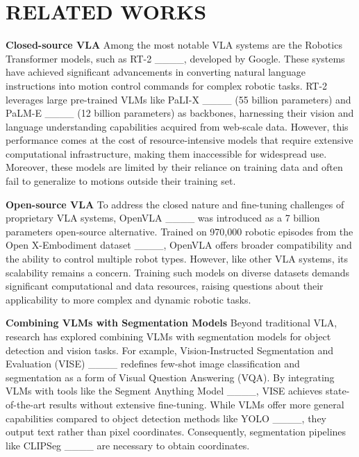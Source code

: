 \section{RELATED WORKS}
\textbf{Closed-source VLA} Among the most notable VLA systems are the Robotics Transformer models, such as RT-2 ____, developed by Google. These systems have achieved significant advancements in converting natural language instructions into motion control commands for complex robotic tasks. RT-2 leverages large pre-trained VLMs like PaLI-X ____ (55 billion parameters) and PaLM-E ____ (12 billion parameters) as backbones, harnessing their vision and language understanding capabilities acquired from web-scale data. However, this performance comes at the cost of resource-intensive models that require extensive computational infrastructure, making them inaccessible for widespread use. Moreover, these models are limited by their reliance on training data and often fail to generalize to motions outside their training set.

\textbf{Open-source VLA} To address the closed nature and fine-tuning challenges of proprietary VLA systems, OpenVLA ____ was introduced as a 7 billion parameters open-source alternative. Trained on 970,000 robotic episodes from the Open X-Embodiment dataset ____, OpenVLA offers broader compatibility and the ability to control multiple robot types. However, like other VLA systems, its scalability remains a concern. Training such models on diverse datasets demands significant computational and data resources, raising questions about their applicability to more complex and dynamic robotic tasks.

\textbf{Combining VLMs with Segmentation Models} Beyond traditional VLA, research has explored combining VLMs with segmentation models for object detection and vision tasks. For example, Vision-Instructed Segmentation and Evaluation (VISE) ____ redefines few-shot image classification and segmentation as a form of Visual Question Answering (VQA). By integrating VLMs with tools like the Segment Anything Model ____, VISE achieves state-of-the-art results without extensive fine-tuning. While VLMs offer more general capabilities compared to object detection methods like YOLO ____, they output text rather than pixel coordinates. Consequently, segmentation pipelines like CLIPSeg ____ are necessary to obtain coordinates.

